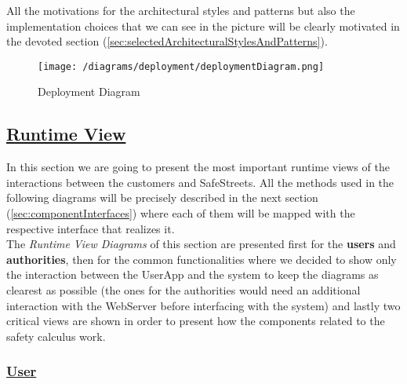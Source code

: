 			All the motivations for the architectural styles and patterns but also the implementation choices that we can see in the picture will be clearly motivated in the devoted section (\ref{sec:selectedArchitecturalStylesAndPatterns}). 
						
			\begin{figure}[hbtp]
				\centering
				\texttt{[image: /diagrams/deployment/deploymentDiagram.png]}
				\caption{\label{fig:deploymentDiagram} Deployment Diagram}
			\end{figure}
		
			\FloatBarrier
			
	\subsection[Runtime View]{\hyperlink{toc}{Runtime View}}
		\label{sec:runtimeView}
		
		In this section we are going to present the most important runtime views of the interactions between the customers and SafeStreets. All the methods used in the following diagrams will be precisely described in the next section (\ref{sec:componentInterfaces}) where each of them will be mapped with the respective interface that realizes it.\\
		
		The \emph{Runtime View Diagrams} of this section are presented first for the \textbf{users} and \textbf{authorities}, then for the common functionalities where we decided to show only the interaction between the UserApp and the system to keep the diagrams as clearest as possible (the ones for the authorities would need an additional interaction with the WebServer before interfacing with the system) and lastly two critical views are shown in order to present how the components related to the safety calculus work.
		
		\subsubsection[User]{\hyperlink{toc}{User}}
			\label{sec:userRuntimeView}
			
